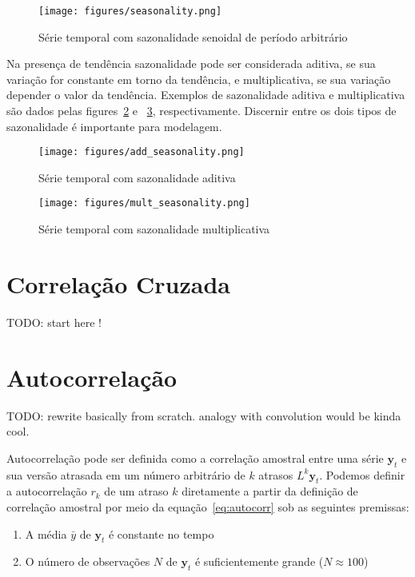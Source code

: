 \begin{figure}[H]
    \centering
    \texttt{[image: figures/seasonality.png]}
    \caption{Série temporal com sazonalidade senoidal de período arbitrário}
    \label{fig:seasonality}
\end{figure}

Na presença de tendência sazonalidade pode ser considerada aditiva, se sua
variação for constante em torno da tendência, e multiplicativa, se sua variação
depender o valor da tendência. Exemplos de sazonalidade aditiva e
multiplicativa são dados pelas figures~\ref{fig:add_seasonality} e
~\ref{fig:mult_seasonality}, respectivamente. Discernir entre os dois tipos de
sazonalidade é importante para modelagem.

\begin{figure}[H]
    \centering
    \texttt{[image: figures/add\_seasonality.png]}
    \caption{Série temporal com sazonalidade aditiva}
    \label{fig:add_seasonality}
\end{figure}

\begin{figure}[H]
    \centering
    \texttt{[image: figures/mult\_seasonality.png]}
    \caption{Série temporal com sazonalidade multiplicativa}
    \label{fig:mult_seasonality}
\end{figure}

\section{Correlação Cruzada}

TODO: start here !

\section{Autocorrelação}

TODO: rewrite basically from scratch. analogy with convolution would be kinda
cool.

Autocorrelação pode ser definida como a correlação amostral entre uma série
$\mathbf{y}_t$ e sua versão atrasada em um número arbitrário de $k$ atrasos
$L^k \mathbf{y}_t$. Podemos definir a autocorrelação $r_k$ de um atraso $k$
diretamente a partir da definição de correlação amostral por meio da
equação~\ref{eq:autocorr} sob as seguintes premissas:

\begin{enumerate}
    \item A média $\bar{y}$ de $\mathbf{y}_t$ é constante no tempo
    \item O número de observações  $N$ de $\mathbf{y}_t$ é suficientemente
    grande ($N \approx 100$)
\end{enumerate}

